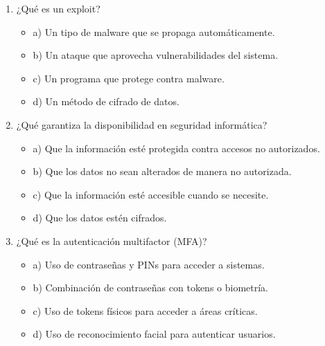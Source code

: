 \documentclass[a4paper]{article}
\begin{document}
\begin{enumerate}
    \item ¿Qué es un exploit?
    \begin{itemize}
        \item a) Un tipo de malware que se propaga automáticamente.
        \item b) Un ataque que aprovecha vulnerabilidades del sistema.
        \item c) Un programa que protege contra malware.
        \item d) Un método de cifrado de datos.
    \end{itemize}
    
    \item ¿Qué garantiza la disponibilidad en seguridad informática?
    \begin{itemize}
        \item a) Que la información esté protegida contra accesos no autorizados.
        \item b) Que los datos no sean alterados de manera no autorizada.
        \item c) Que la información esté accesible cuando se necesite.
        \item d) Que los datos estén cifrados.
    \end{itemize}
    
    \item ¿Qué es la autenticación multifactor (MFA)?
    \begin{itemize}
        \item a) Uso de contraseñas y PINs para acceder a sistemas.
        \item b) Combinación de contraseñas con tokens o biometría.
        \item c) Uso de tokens físicos para acceder a áreas críticas.
        \item d) Uso de reconocimiento facial para autenticar usuarios.
    \end{itemize}
    

\end{enumerate}
\end{document}
